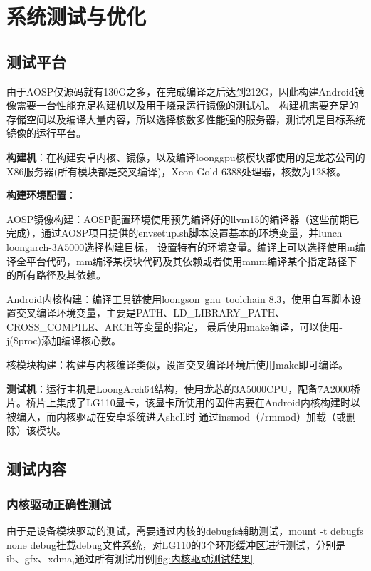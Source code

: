 
\chapter{系统测试与优化}

\section{测试平台}
由于AOSP仅源码就有130G之多，在完成编译之后达到212G，因此构建Android镜像需要一台性能充足构建机以及用于烧录运行镜像的测试机。
构建机需要充足的存储空间以及编译大量内容，所以选择核数多性能强的服务器，测试机是目标系统镜像的运行平台。

\textbf{构建机}：在构建安卓内核、镜像，以及编译loonggpu核模块都使用的是龙芯公司的X86服务器(所有模块都是交叉编译)，Xeon Gold 6388处理器，核数为128核。

\textbf{构建环境配置}：

    AOSP镜像构建：AOSP配置环境使用预先编译好的llvm15的编译器（这些前期已完成），通过AOSP项目提供的envsetup.sh脚本设置基本的环境变量，并lunch loongarch-3A5000选择构建目标，
        设置特有的环境变量。编译上可以选择使用m编译全平台代码，mm编译某模块代码及其依赖或者使用mmm编译某个指定路径下的所有路径及其依赖。

    Android内核构建：编译工具链使用loongson\ gnu\ toolchain 8.3，使用自写脚本设置交叉编译环境变量，主要是PATH、LD\_LIBRARY\_PATH、CROSS\_COMPILE、ARCH等变量的指定，
        最后使用make编译，可以使用-j(\$proc)添加编译核心数。

    核模块构建：构建与内核编译类似，设置交叉编译环境后使用make即可编译。

\textbf{测试机}：运行主机是LoongArch64结构，使用龙芯的3A5000CPU，配备7A2000桥片。桥片上集成了LG110显卡，该显卡所使用的固件需要在Android内核构建时以被编入，而内核驱动在安卓系统进入shell时
    通过insmod（/rmmod）加载（或删除）该模块。

\section{测试内容}

\subsection{内核驱动正确性测试}
由于是设备模块驱动的测试，需要通过内核的debugfs辅助测试，mount -t debugfs none debug挂载debug文件系统，对LG110的3个环形缓冲区进行测试，分别是
ib、gfx、xdma,通过所有测试用例\ref{fig:内核驱动测试结果}

